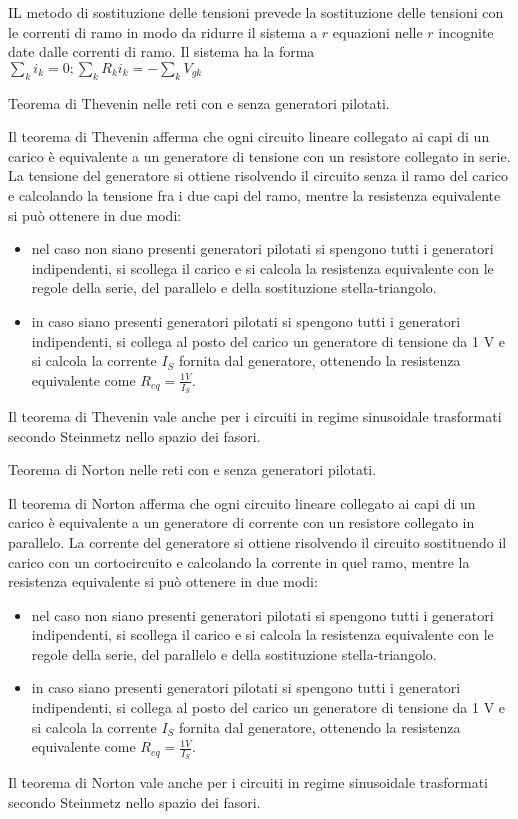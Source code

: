 \documentclass[answers, a4paper,12pt]{exam}
\begin{document}
\begin{questions}
\begin{solution}
		IL metodo di sostituzione delle tensioni prevede la sostituzione delle tensioni con le correnti di ramo in modo da ridurre il sistema a $r$ equazioni nelle $r$ incognite date dalle correnti di ramo. Il sistema ha la forma $\sum_k i_k = 0; \sum_k R_k i_k = - \sum_k V_{gk}$
	\end{solution}
	\question
	Teorema di Thevenin nelle reti con e senza generatori pilotati.
	\begin{solution}Il teorema di Thevenin afferma che ogni circuito lineare collegato ai capi di un carico è equivalente a un generatore di tensione con un resistore collegato in serie. La tensione del generatore si ottiene risolvendo il circuito senza il ramo del carico e calcolando la tensione fra i due capi del ramo, mentre la resistenza equivalente si può ottenere in due modi:
	\begin{itemize}
		\item nel caso non siano presenti generatori pilotati si spengono tutti i generatori indipendenti, si scollega il carico e si calcola la resistenza equivalente con le regole della serie, del parallelo e della sostituzione stella-triangolo. 
		\item in caso siano presenti generatori pilotati si spengono tutti i generatori indipendenti, si collega al posto del carico un generatore di tensione da 1 V e si calcola la corrente $I_S$ fornita dal generatore, ottenendo la resistenza equivalente come $R_{eq} = \frac{1 V}{I_S}$.
\end{itemize}
Il teorema di Thevenin vale anche per i circuiti in regime sinusoidale trasformati secondo Steinmetz nello spazio dei fasori.
\end{solution}
	\question
	Teorema di Norton nelle reti con e senza generatori pilotati.
	\begin{solution}Il teorema di Norton afferma che ogni circuito lineare collegato ai capi di un carico è equivalente a un generatore di corrente con un resistore collegato in parallelo. La corrente del generatore si ottiene risolvendo il circuito sostituendo il carico con un cortocircuito e calcolando la corrente in quel ramo, mentre la resistenza equivalente si può ottenere in due modi:
		\begin{itemize}
			\item nel caso non siano presenti generatori pilotati si spengono tutti i generatori indipendenti, si scollega il carico e si calcola la resistenza equivalente con le regole della serie, del parallelo e della sostituzione stella-triangolo. 
			\item in caso siano presenti generatori pilotati si spengono tutti i generatori indipendenti, si collega al posto del carico un generatore di tensione da 1 V e si calcola la corrente $I_S$ fornita dal generatore, ottenendo la resistenza equivalente come $R_{eq} = \frac{1 V}{I_S}$.
		\end{itemize}
		Il teorema di Norton vale anche per i circuiti in regime sinusoidale trasformati secondo Steinmetz nello spazio dei fasori.\end{solution}
		

\end{questions}
\end{document}
